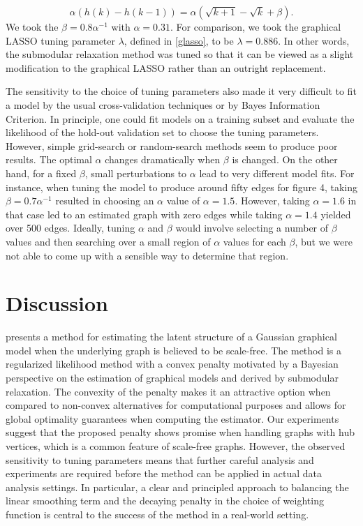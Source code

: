 \documentclass{uwstat572}
\theoremstyle{remark}
\theoremstyle{definition}
\begin{document}
\begin{equation*}
    \alpha \left( h(k) - h(k-1) \right) = \alpha \left( \sqrt{k+1} - \sqrt{k} + \beta \right).
\end{equation*}
We took the $\beta = 0.8 \alpha^{-1}$ with $\alpha = 0.31$.  For comparison, we took the graphical LASSO tuning parameter $\lambda$, defined in \eqref{glasso}, to be $\lambda = 0.886$.  In other words, the submodular relaxation method was tuned so that it can be viewed as a slight modification to the graphical LASSO rather than an outright replacement.  

The sensitivity to the choice of tuning parameters also made it very difficult to fit a model by the usual cross-validation techniques or by Bayes Information Criterion.  In principle, one could fit models on a training subset and evaluate the likelihood of the hold-out validation set to choose the tuning parameters.  However, simple grid-search or random-search methods seem to produce poor results.  The optimal $\alpha$ changes dramatically when $\beta$ is changed.  On the other hand, for a fixed $\beta$, small perturbations to $\alpha$ lead to very different model fits. For instance, when tuning the model to produce around fifty edges for figure 4, taking $\beta = 0.7 \alpha^{-1}$ resulted in choosing an $\alpha$ value of $\alpha = 1.5$.  However, taking $\alpha = 1.6$ in that case led to an estimated graph with zero edges while taking $\alpha = 1.4$ yielded over 500 edges.  Ideally, tuning $\alpha$ and $\beta$ would involve selecting a number of $\beta$ values and then searching over a small region of $\alpha$ values for each $\beta$, but we were not able to come up with a sensible way to determine that region.


\section{Discussion}

\cite{Defazio2012} presents a method for estimating the latent structure of a Gaussian graphical model when the underlying graph is believed to be scale-free.  The method is a regularized likelihood method with a convex penalty motivated by a Bayesian perspective on the estimation of graphical models and derived by submodular relaxation.  The convexity of the penalty makes it an attractive option when compared to non-convex alternatives for computational purposes and allows for global optimality guarantees when computing the estimator. Our experiments suggest that the proposed penalty shows promise when handling graphs with hub vertices, which is a common feature of scale-free graphs.  However, the observed sensitivity to tuning parameters means that further careful analysis and experiments are required before the method can be applied in actual data analysis settings.  In particular, a clear and principled approach to balancing the linear smoothing term and the decaying penalty in the choice of weighting function is central to the success of the method in a real-world setting.


\end{document}
